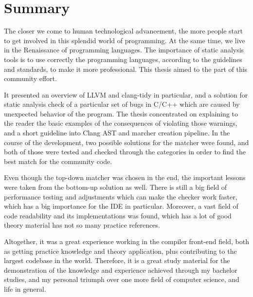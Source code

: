 \chapter{Summary}

The closer we come to human technological advancement, the more people start to get involved in this splendid world of programming. At the same time, we live in the Renaissance of programming languages. The importance of static analysis tools is to use correctly the programming languages, according to the guidelines and standards, to make it more professional. This thesis aimed to the part of this community effort.


It presented an overview of LLVM and clang-tidy in particular, and a solution for static analysis check of a particular set of bugs in C/C++ which are caused by unexpected behavior of the program. The thesis concentrated on explaining to the reader the basic examples of the consequences of violating those warnings, and a short guideline into Clang AST and marcher creation pipeline.  In the course of the development, two possible solutions for the matcher were found, and both of those were tested and checked through the categories in order to find the best match for the community code. 

Even though the top-down matcher was chosen in the end, the important lessons were taken from the bottom-up solution as well. There is still a big field of performance testing and adjustments which can make the checker work faster, which has a big importance for the IDE in particular. Moreover, a vast field of code readability and its implementations was found, which has a lot of good theory material has not so many practice references.

Altogether, it was a great experience working in the compiler front-end field, both as getting practice knowledge and theory application, plus contributing to the largest codebase in the world. Therefore, it is a great study material for the demonstration of the knowledge and experience achieved through my bachelor studies, and my personal triumph over one more field of computer science, and life in general.  